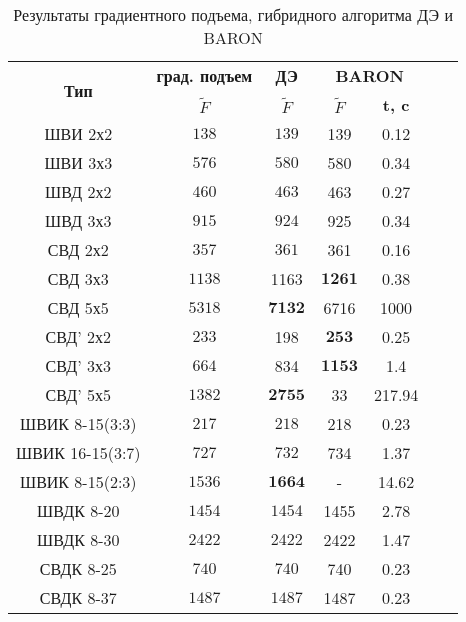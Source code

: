 \begin{table}[!h]

\centering
\caption{ Результаты градиентного подъема, гибридного алгоритма ДЭ и BARON}
\begin{tabular}{|c|c|c|cc|c c|}
    \hline
    \multirow{2}{*}{\textbf{Тип}} & \textbf{град. подъем} & \textbf{ДЭ} & \multicolumn{2}{|c|}{\textbf{BARON}} \\
    & \textbf{$\tilde{F}$} & \textbf{$\tilde{F}$} & \textbf{$\tilde{F}$} & \textbf{t, c}  \\
    \hline
    ШВИ 2х2         & ${138}$  & ${139}$   & 139    & 0.12      \\
    ШВИ 3х3         & ${576}$ & ${580}$   & 580    & 0.34       \\
    ШВД 2х2         & ${460}$ & ${463}$   & 463    & 0.27     \\
    ШВД 3х3         & ${915}$ & ${924}$   & 925    & 0.34        \\
    СВД 2х2        & ${357}$  & ${361}$   & 361    & 0.16         \\
    СВД 3х3        & ${1138}$ & 1163  & $\mathbf{1261}$   & 0.38     \\
    СВД 5х5        & ${5318}$  & $\mathbf{7132}$  & 6716   & 1000   \\
    СВД' 2х2       & ${233}$ & 198   & $\mathbf{253}$    & 0.25         \\
    СВД' 3х3       & ${664}$ & 834   & $\mathbf{1153}$   & 1.4          \\
    СВД' 5х5       & ${1382}$  & $\mathbf{2755}$  & 33     & 217.94     \\
    ШВИК 8-15(3:3) & ${217}$  & ${218}$   & 218    & 0.23       \\
    ШВИК 16-15(3:7)& ${727}$  & ${732}$   & 734    & 1.37     \\
    ШВИК 8-15(2:3) & ${1536}$  & $\mathbf{1664}$     & -   & 14.62     \\
    ШВДК 8-20      & ${1454}$  & ${1454}$  & 1455   & 2.78       \\
    ШВДК 8-30      & ${2422}$  & ${2422}$  & 2422   & 1.47     \\
    СВДК 8-25      & ${740}$  & ${740}$   & 740    & 0.23        \\
    СВДК 8-37      & ${1487}$  & ${1487}$  & 1487   & 0.23      \\
    \hline
\end{tabular}
\label{tab:results_de}
\end{table}

